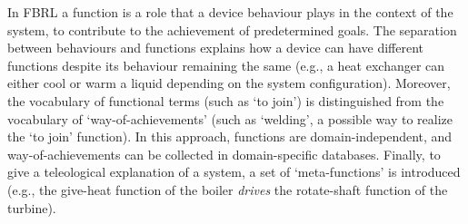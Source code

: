 \documentclass[
]{ceurart}
\begin{document}
\begin{itemize}
    In FBRL a function is a role that a device behaviour plays in the context of the system, to contribute to the achievement of predetermined goals. The separation between behaviours and functions explains how a device can have different functions despite its behaviour remaining the same (e.g., a heat exchanger can either cool or warm a liquid depending on the system configuration). Moreover, the vocabulary of functional terms (such as `to join') is distinguished from the vocabulary of `way-of-achievements' (such as `welding', a possible way to realize the `to join' function). 
    In this approach, functions are domain-independent, and way-of-achievements can be collected in domain-specific databases.
    Finally, to give a teleological explanation of a system, a set of `meta-functions' is introduced (e.g., the give-heat function of the boiler \textit{drives} the rotate-shaft function of the turbine). 
\end{itemize}
\end{document}
